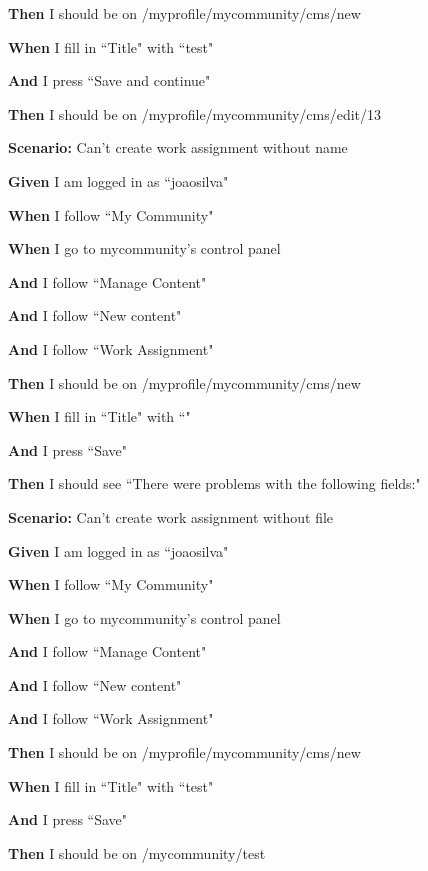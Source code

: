     \textbf{Then} I should be on /myprofile/mycommunity/cms/new
    
    \textbf{When} I fill in ``Title" with ``test"
    
    \textbf{And} I press ``Save and continue"
    
    \textbf{Then} I should be on /myprofile/mycommunity/cms/edit/13

 

\item \textbf{Scenario:} Can't create work assignment without name
    
    \textbf{Given}  I am logged in as ``joaosilva" 
    
    \textbf{When} I follow ``My Community"
    
    \textbf{When} I go to mycommunity's control panel
    
    \textbf{And} I follow ``Manage Content"
    
    \textbf{And} I follow ``New content"
    
    \textbf{And} I follow ``Work Assignment"
    
    \textbf{Then} I should be on /myprofile/mycommunity/cms/new
    
    \textbf{When} I fill in ``Title" with ``"
    
    \textbf{And} I press ``Save"
    
    \textbf{Then} I should see ``There were problems with the following fields:"

\item \textbf{Scenario:} Can't create work assignment without file
   
    \textbf{Given} I am logged in as ``joaosilva" 
   
    \textbf{When} I follow ``My Community"
   
    \textbf{When} I go to mycommunity's control panel
   
    \textbf{And} I follow ``Manage Content"
   
    \textbf{And} I follow ``New content"
   
    \textbf{And} I follow ``Work Assignment"
   
    \textbf{Then} I should be on /myprofile/mycommunity/cms/new
   
    \textbf{When} I fill in ``Title" with ``test"
   
    \textbf{And} I press ``Save"
   
    \textbf{Then} I should be on /mycommunity/test
   
